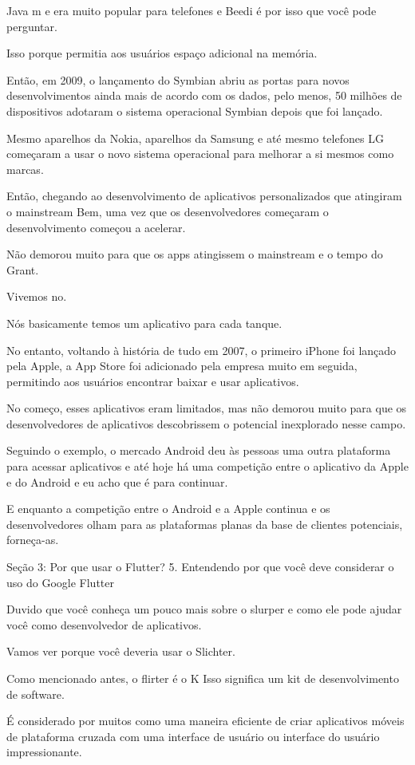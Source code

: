 Java m e era muito popular para telefones e Beedi é por isso que você pode perguntar.

Isso porque permitia aos usuários espaço adicional na memória.

Então, em 2009, o lançamento do Symbian abriu as portas para novos desenvolvimentos ainda mais de acordo com os dados, pelo menos, 50 milhões de dispositivos adotaram o sistema operacional Symbian depois que foi lançado.

Mesmo aparelhos da Nokia, aparelhos da Samsung e até mesmo telefones LG começaram a usar o novo sistema operacional para melhorar a si mesmos como marcas.

Então, chegando ao desenvolvimento de aplicativos personalizados que atingiram o mainstream Bem, uma vez que os desenvolvedores começaram o desenvolvimento começou a acelerar.

Não demorou muito para que os apps atingissem o mainstream e o tempo do Grant.

Vivemos no.

Nós basicamente temos um aplicativo para cada tanque.

No entanto, voltando à história de tudo em 2007, o primeiro iPhone foi lançado pela Apple, a App Store foi adicionado pela empresa muito em seguida, permitindo aos usuários encontrar baixar e usar aplicativos.

No começo, esses aplicativos eram limitados, mas não demorou muito para que os desenvolvedores de aplicativos descobrissem o potencial inexplorado nesse campo.

Seguindo o exemplo, o mercado Android deu às pessoas uma outra plataforma para acessar aplicativos e até hoje há uma competição entre o aplicativo da Apple e do Android e eu acho que é para continuar.

E enquanto a competição entre o Android e a Apple continua e os desenvolvedores olham para as plataformas planas da base de clientes potenciais, forneça-as.


Seção 3: Por que usar o Flutter?
5. Entendendo por que você deve considerar o uso do Google
Flutter


Duvido que você conheça um pouco mais sobre o slurper e como ele pode ajudar você como desenvolvedor de aplicativos.

Vamos ver porque você deveria usar o Slichter.

Como mencionado antes, o flirter é o K Isso significa um kit de desenvolvimento de software.

É considerado por muitos como uma maneira eficiente de criar aplicativos móveis de plataforma cruzada com uma interface de usuário ou interface do usuário impressionante.

